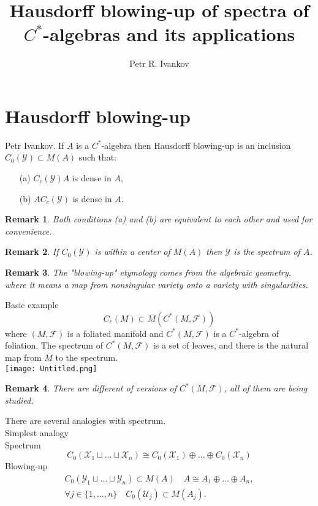 \documentclass{beamer}
\title{Hausdorff blowing-up of spectra of $C^*$-algebras and its applications}
\institute
{
Algebras in analysis
}
\author{Petr R. Ivankov  }
\theoremstyle{plain}
\newtheorem{rem}{Remark}
\newcommand{\sF}{\mathcal{F}}       %
\newcommand{\sU}{\mathcal{U}}       %
\newcommand{\sX}{\mathcal{X}}       %
\newcommand{\sY}{\mathcal{Y}}       %
\newcommand{\bean}{\begin{eqnarray*}}
\newcommand{\eean}{\end{eqnarray*}}
\begin{document}
\begin{frame}
  \titlepage
\end{frame}
\section{Hausdorff blowing-up}
\begin{frame}
	\begin{definition}\label{blowing_u_defn}\alert{Petr Ivankov.}
		If $A$ is a $C^*$-algebra then \alert{Hausdorff blowing-up} is an inclusion  $C_0\left( \sY\right) \subset M\left( A\right)$ such that:
		\begin{enumerate}
			\item[(a)] $C_c\left( \sY\right)A$ is dense in $A$,
			\item [(b)]  $AC_c\left( \sY\right)$ is dense in $A$.
		\end{enumerate} 
	\end{definition}
	\begin{rem}
		Both conditions (a) and (b) are equivalent to each other and used for convenience.
	\end{rem}
	\begin{rem}
		If $C_0\left( \sY\right)$ is within a center of $M\left( A\right)$ then $\sY$ is the spectrum of $A$.
	\end{rem}
	\begin{rem}
		The "blowing-up" etymology comes from the algebraic geometry, where it means a map from nonsingular variety  onto a variety with singularities.
	\end{rem}
\end{frame}
\begin{frame}
	Basic example $$C_c\left(M \right) \subset M\left( C^*\left(M, \sF \right)\right) $$  where 
	$\left(M, \sF \right)$ is a foliated manifold and  $C^*\left(M, \sF \right)$ is a $C^*$-algebra of foliation. The spectrum of $C^*\left(M, \sF \right)$ is a set of leaves, and there is the natural map from $M$ to the spectrum.
\\
\texttt{[image: Untitled.png]}
\begin{rem}
There are different of versions of $ C^*\left(M, \sF \right)$, all of them are being studied.
\end{rem}
\end{frame}
\begin{frame}
There are several  analogies  with spectrum.\\
Simplest analogy\\
Spectrum
$$
C_0\left(\sX_1\sqcup ...\sqcup \sX_n \right) \cong C_0\left(\sX_1 \right) \oplus ...\oplus C_0\left(\sX_n \right) 
$$
Blowing-up
\bean
C_0\left( \sY_1\sqcup ...\sqcup \sY_n\right)\subset M\left( A\right)\quad   
A \cong A_1\oplus ...\oplus A_n,\\
\forall j \in \{1,...,n\}\quad C_0\left(\sU_j \right) \subset M\left(A_j \right). 
\eean

\end{frame}
\end{document}

